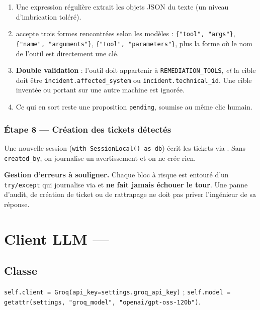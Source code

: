 \begin{enumerate}
  \item Une expression régulière  extrait les objets JSON du
  texte (un niveau d'imbrication toléré).
  \item {} accepte trois formes rencontrées selon les
  modèles : \texttt{\{"tool", "args"\}}, \texttt{\{"name", "arguments"\}},
  \texttt{\{"tool", "parameters"\}}, plus la forme où le nom de l'outil est
  directement une clé.
  \item \textbf{Double validation} : l'outil doit appartenir à
  \texttt{REMEDIATION\_TOOLS}, \emph{et} la cible doit être
  \texttt{incident.affected\_system} ou \texttt{incident.technical\_id}. Une
  cible inventée ou portant sur une autre machine est ignorée.
  \item Ce qui en sort reste une proposition \texttt{pending}, soumise au même
  clic humain.
\end{enumerate}

\subsubsection*{Étape 8 --- Création des tickets détectés}
Une nouvelle session (\texttt{with SessionLocal() as db}) écrit les tickets via
. Sans \texttt{created\_by}, on journalise un
avertissement et on ne crée rien.

\begin{warnbox}
\textbf{Gestion d'erreurs à souligner.} Chaque bloc à risque est entouré d'un
\texttt{try/except} qui journalise via  et \textbf{ne fait
jamais échouer le tour}. Une panne d'audit, de création de ticket ou de
rattrapage ne doit pas priver l'ingénieur de sa réponse.
\end{warnbox}

\section{Client LLM --- }

\subsection*{Classe }
\texttt{self.client = Groq(api\_key=settings.groq\_api\_key)} ;
\texttt{self.model = getattr(settings, "groq\_model", "openai/gpt-oss-120b")}.

